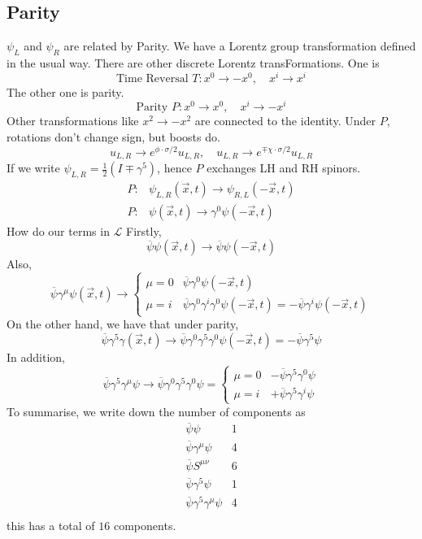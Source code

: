 \subsection{Parity} 
$ \psi _ L $ and $ \psi _ R $ are related by Parity. 
We have a Lorentz group transformation defined 
in the usual way. There are other discrete Lorentz transFormations. 
One is 
\[
 \text{Time Reversal } T : x ^ 0 \to  - x ^ 0 , \quad x ^ i \to x ^ i 
\] The other one is parity. 
\[
 \text{Parity } P : x ^ 0 \to x ^ 0 , \quad x ^ i \to  - x ^ i 
\] Other transformations like  $x ^ 2 \to - x ^ 2 $
are connected to the identity. 
Under $ P $, rotations don't change sign, but 
boosts do. 
\[
 u_{ L , R } \to e^{ \phi \cdot  \sigma / 2} u_{ L , R }, \quad 
 u _{ L, R } \to e^{  \mp \chi \cdot  \sigma / 2} u_{ L, R }
\] If we write $ \psi _{ L , R }  = \frac{1}{2 } ( I \mp \gamma ^ 5 )  $, 
hence $ P $ exchanges LH and RH spinors. 
\begin{align*}
	P : & \psi_{ L , R } ( \vec{x} , t ) \to \psi_{ R, L } ( - \vec{x} ,  t) \\
	P : & \psi ( \vec{x}, t ) \to \gamma ^ 0 \psi ( - \vec{x}, t ) 
\end{align*}
How do our terms in $\mathcal{ L } $ 
Firstly, 
\[
	\overline{ \psi } \psi ( \vec{x}, t) \to \overline{ \psi } \psi ( - \vec{x}, t ) 
\] Also, 
\[
	\overline{\psi } \gamma ^ \mu \psi ( \vec{x}, t ) \to \begin{cases}
		\mu = 0 & \overline{ \psi } \gamma ^ 0 \psi ( - \vec{x}, t ) \\
		\mu = i & \overline{ \psi } \gamma ^ 0 \gamma ^ i \gamma ^ 0 \psi ( -\vec{x}, t ) 
		= - \overline{ \psi } \gamma ^ i \psi ( - \vec{x}, t ) 
	\end{cases}
\] On the other hand, we have that under parity, 
\[
	\overline{ \psi } \gamma ^ 5 \gamma ( \vec{x}, t ) \to \overline{ \psi } \gamma ^ 0 \gamma ^ 5 \gamma ^ 0 
	\psi ( - \vec{x}, t ) = - \overline{ \psi } \gamma ^ 5 \psi 
\] In addition, 
\[
 \overline{ \psi } \gamma ^ 5 \gamma ^ \mu \psi \to \overline{ \psi } \gamma ^ 0 \gamma ^ 5 \gamma ^ 0 \psi 
  = \begin{cases}
	  \mu = 0 &  - \overline{ \psi } \gamma ^5 \gamma ^ 0 \psi \\
	  \mu = i & + \overline{ \psi } \gamma ^5 \gamma ^ i \psi 
  \end{cases}
\] To summarise, 
we write down the number of components as
\begin{equation}
\begin{aligned}
	\overline{ \psi } \psi &1\\
	\overline{ \psi } \gamma ^ \mu \psi &4\\
	\overline{\psi } S^{ \mu \nu } & 6\\
	\overline{\psi } \gamma ^  5 \psi & 1\\
	\overline{\psi } \gamma ^ 5 \gamma ^ \mu \psi & 4\\ 
\end{aligned} 
\end{equation}this has a total of $ 16 $ components. 

